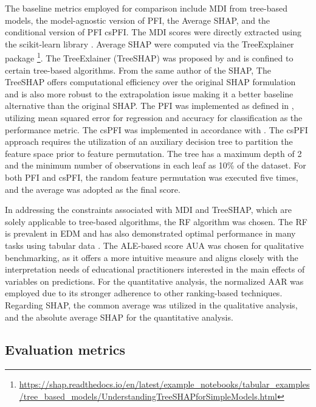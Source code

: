 The baseline metrics employed for comparison include  \gls{MDI} from tree-based models, the model-agnostic version of \gls{PFI}, the Average \gls{SHAP}, and the conditional version of PFI \gls{csPFI}. The \gls{MDI} scores were directly extracted using the scikit-learn library \cite{scikit-learn}. Average \gls{SHAP} were computed via the TreeExplainer package \footnote{\url{https://shap.readthedocs.io/en/latest/example\_notebooks/tabular\_examples/tree\_based_models/UnderstandingTreeSHAPforSimpleModels.html}}. The TreeExlainer (TreeSHAP)  was proposed by \cite{Lundberg2020FromTrees.} and is confined to certain tree-based algorithms. From the same author of the \gls{SHAP}, The TreeSHAP offers computational efficiency over the original \gls{SHAP} formulation and is also more robust to the extrapolation issue making it a better baseline alternative than the original \gls{SHAP}. The \gls{PFI} was implemented as defined in \cite{Fisher2018AllSimultaneously}, utilizing mean squared error for regression and accuracy for classification as the performance metric. The \gls{csPFI} was implemented in accordance with \cite{Molnar2023Model-agnosticApproach}. The \gls{csPFI} approach requires the utilization of an auxiliary decision tree to partition the feature space prior to feature permutation. The tree has a maximum depth of 2 and the minimum number of observations in each leaf as 10\% of the dataset. For both \gls{PFI} and \gls{csPFI}, the random feature permutation was executed five times, and the average was adopted as the final score.

In addressing the constraints associated with \gls{MDI} and TreeSHAP, which are solely applicable to tree-based algorithms, the \gls{RF} algorithm was chosen. The RF is prevalent in \gls{EDM}\cite{Martinez-Abad2020EducationalAssessment} and has also demonstrated optimal performance in many tasks using tabular data \cite{Grinsztajn2022WhyData}. The \gls{ALE}-based score \gls{AUA} was chosen for qualitative benchmarking, as it offers a more intuitive measure and aligns closely with the interpretation needs of educational practitioners interested in the main effects of variables on predictions. For the quantitative analysis, the normalized \gls{AAR} was employed due to its stronger adherence to other ranking-based techniques. Regarding \gls{SHAP}, the common average was utilized in the qualitative analysis, and the absolute average \gls{SHAP} for the quantitative analysis.    

\subsection{Evaluation metrics}

